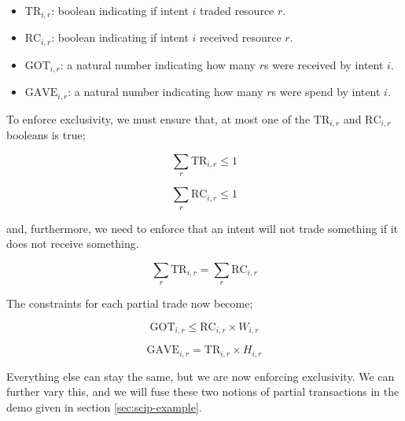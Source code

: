 \begin{itemize}
    \item $\text{TR}_{i, r}$:  boolean indicating if intent $i$ traded resource $r$.
    \item $\text{RC}_{i, r}$:  boolean indicating if intent $i$ received resource $r$.
    \item $\text{GOT}_{i, r}$: a natural number indicating how many $r$s were received by intent $i$.
    \item $\text{GAVE}_{i, r}$: a natural number indicating how many $r$s were spend by intent $i$.
\end{itemize}

To enforce exclusivity, we must ensure that, at most one of the $\text{TR}_{i, r}$ and $\text{RC}_{i, r}$ booleans is true;

\begin{equation}
    \sum_r \text{TR}_{i, r} \leq 1
\end{equation}

\begin{equation}
    \sum_r \text{RC}_{i, r} \leq 1
\end{equation}

and, furthermore, we need to enforce that an intent will not trade something if it does not receive something.

\begin{equation}
    \sum_r \text{TR}_{i, r} = \sum_r \text{RC}_{i, r}
\end{equation}

The constraints for each partial trade now become;

\begin{equation}
    \text{GOT}_{i, r} \leq \text{RC}_{i, r} \times W_{i, r}
\end{equation}

\begin{equation}
    \text{GAVE}_{i, r} = \text{TR}_{i, r} \times H_{i, r}
\end{equation}

Everything else can stay the same, but we are now enforcing exclusivity. We can further vary this, and we will fuse these two notions of partial transactions in the demo given in section \ref{sec:scip-example}.



